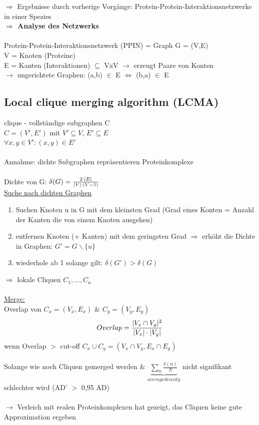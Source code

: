 $\Rightarrow$ Ergebnisse durch vorherige Vorgänge: Protein-Protein-Interaktionsnetzwerke in einer Spezies\\
\textbf{$\Rightarrow$ Analyse des Netzwerks}
\\\\
Protein-Protein-Interaktionsnetzwerk (PPIN) = Graph G = (V,E)\\
V = Knoten (Proteine)\\
E = Kanten (Interaktionen) $\subseteq$ VxV $\rightarrow$ erzeugt Paare von Konten\\
$\rightarrow$ ungerichtete Graphen: (a,b) $\in$ E $\Leftrightarrow$ (b,a) $\in$ E

\subsection{Local clique merging algorithm (LCMA)}
clique - vollständige subgraphen C\\
$C=(V',E')$ mit $V'\subseteq V$, $E'\subseteq E$\\
$\forall x,y \in V': (x,y) \in E'$\\
\\
Annahme: dichte Subgraphen repräsentieren Proteinkomplexe\\\\
Dichte von G: $\delta(G) = {2 \cdot |E| \over |V| \cdot |V-1|}$\\

\underline{Suche nach dichten Graphen}
\begin{enumerate}
	\item Suchen Knoten u in G mit dem kleinsten Grad (Grad eines Konten = Anzahl der Kanten die von einem Knoten ausgehen)
	\item entfernen Knoten (+ Kanten) mit dem geringsten Grad $\Rightarrow$ erhöht die Dichte in Graphen: $G'=G\backslash\{u\}$
	\item wiederhole ab 1 solange gilt: $\delta(G') > \delta(G)$
\end{enumerate}

$\Rightarrow$ lokale Cliquen $C_{1},…,C_{n}$\\\\
\underline{Merge:}\\
Overlap von $C_{x}=(V_{x},E_{x})$ \& $C_{y}=(V_{y},E_{y})$\\
\begin{equation}
Overlap={|V_{x} \cap V_{y}|^2 \over |V_{x}| \cdot |V_{y}|}
\end{equation}
wenn Overlap $>$ cut-off $C_{x} \cup C_{y}= (V_{x} \cap V_{y}, E_{x} \cap E_{y})$\\\\
Solange wie noch Cliquen gemerged werden \& $\underbrace{\sum \limits_{n} \frac{\delta(n)}{N}}_{average density}$ nicht signifikant schlechter wird (AD' $>$ 0,95 AD)\\\\
$\rightarrow$ Verleich mit realen Proteinkomplexen hat gezeigt, das Cliquen keine gute Approximation ergeben

